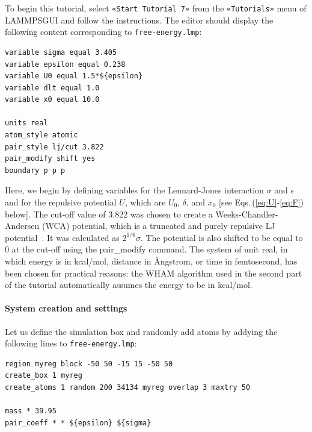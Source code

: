 \documentclass[9pt,tutorial]{livecoms}
\newcommand{\lmpcmd}[1]{\hspace{0pt}\colorbox{listing}{\textcolor{command}{\small{#1}}}\hspace{0pt}} %
\newcommand{\flecmd}[1]{\textcolor{command}{\texttt{#1}}} %
\newcommand{\guicmd}[1]{\textcolor{command}{\texttt{«#1»}}} %
\newcommand{\lammpsgui}{\textsf{LAMMPS\textendash GUI}}
\begin{document}
To begin this tutorial, select \guicmd{Start Tutorial 7} from the
\guicmd{Tutorials} menu of \lammpsgui{} and follow the instructions.
The editor should display the following content corresponding to \flecmd{free-energy.lmp}:
\begin{lstlisting}
variable sigma equal 3.405
variable epsilon equal 0.238
variable U0 equal 1.5*${epsilon}
variable dlt equal 1.0
variable x0 equal 10.0

units real
atom_style atomic
pair_style lj/cut 3.822
pair_modify shift yes
boundary p p p
\end{lstlisting}
Here, we begin by defining variables for the Lennard-Jones interaction
$\sigma$ and $\epsilon$ and for the repulsive potential $U$, which are $U_0$, $\delta$, and $x_0$
[see Eqs.\,(\ref{eq:U}-\ref{eq:F}) below].  The cut-off value of 3.822 was chosen
to create a Weeks-Chandler-Andersen (WCA) potential, which is a truncated and
purely repulsive LJ potential~\cite{weeks1971role}.  It was calculated
as $2^{1/6} \sigma$.  The potential is also shifted to be
equal to 0 at the cut-off using the \lmpcmd{pair\_modify} command.  The system of unit
\lmpcmd{real}, in which energy is in kcal/mol, distance in Ångstrom, or time in
femtosecond, has been chosen for practical reasons: the WHAM algorithm used in
the second part of the tutorial automatically assumes the energy to be in kcal/mol.

\paragraph{System creation and settings}

Let us define the simulation box and randomly add atoms by addying the
following lines to \flecmd{free-energy.lmp}:
\begin{lstlisting}
region myreg block -50 50 -15 15 -50 50
create_box 1 myreg
create_atoms 1 random 200 34134 myreg overlap 3 maxtry 50

mass * 39.95
pair_coeff * * ${epsilon} ${sigma}
\end{lstlisting}
\end{document}
